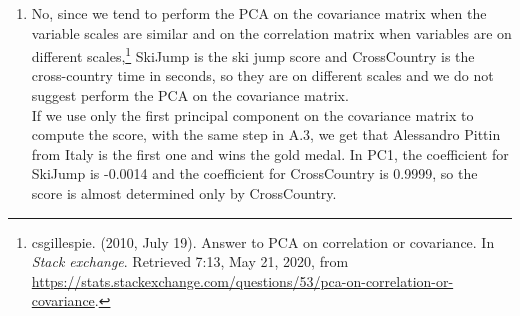 \documentclass[10pt]{article}
\begin{document}
\begin{enumerate}[1)]
\item
No, since we tend to perform the PCA on the covariance matrix when the variable scales are similar and on the correlation matrix when variables are on different scales,\footnote{\;csgillespie. (2010, July 19). Answer to PCA on correlation or covariance. In \textit{Stack exchange}. Retrieved 7:13, May 21, 2020, from \url{https://stats.stackexchange.com/questions/53/pca-on-correlation-or-covariance}.} {\ttfamily SkiJump} is the ski jump score and {\ttfamily CrossCountry} is the cross-country time in seconds, so they are on different scales and we do not suggest perform the PCA on the covariance matrix.\\
If we use only the first principal component on the covariance matrix to compute the score, with the same step in A.3, we get that Alessandro Pittin from Italy is the first one and wins the gold medal. In PC1, the coefficient for {\ttfamily SkiJump} is -0.0014 and the coefficient for {\ttfamily CrossCountry} is 0.9999, so the score is almost determined only by {\ttfamily CrossCountry}.

\end{enumerate}
\vspace{6mm}
\end{document}
